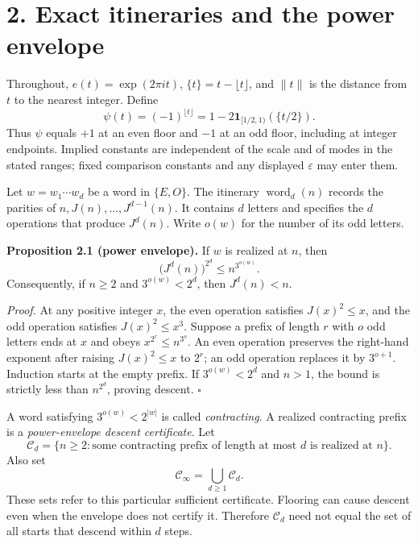 \documentclass[11pt,a4paper]{article}
\begin{document}
\endgroup

\section{2. Exact itineraries and the power
envelope}\label{exact-itineraries-and-the-power-envelope}

Throughout, \(e(t)=\exp(2\pi i t)\), \(\{t\}=t-\lfloor t\rfloor\), and
\(\|t\|\) is the distance from \(t\) to the nearest integer. Define \[
\psi(t)=(-1)^{\lfloor t\rfloor}
=1-2\mathbf 1_{[1/2,1)}(\{t/2\}).
\] Thus \(\psi\) equals \(+1\) at an even floor and \(-1\) at an odd
floor, including at integer endpoints. Implied constants are independent
of the scale and of modes in the stated ranges; fixed comparison
constants and any displayed \(\varepsilon\) may enter them.

Let \(w=w_1\cdots w_d\) be a word in \(\{E,O\}\). The itinerary
\(\operatorname{word}_d(n)\) records the parities of
\(n,J(n),\ldots,J^{d-1}(n)\). It contains \(d\) letters and specifies
the \(d\) operations that produce \(J^d(n)\). Write \(o(w)\) for the
number of its odd letters.


\textbf{Proposition 2.1 (power envelope).} If \(w\) is realized at
\(n\), then \[
\bigl(J^d(n)\bigr)^{2^d}\le n^{3^{o(w)}}.
\] Consequently, if \(n\ge2\) and \(3^{o(w)}<2^d\), then \(J^d(n)<n\).

\emph{Proof.} At any positive integer \(x\), the even operation
satisfies \(J(x)^2\le x\), and the odd operation satisfies
\(J(x)^2\le x^3\). Suppose a prefix of length \(r\) with \(o\) odd
letters ends at \(x\) and obeys \(x^{2^r}\le n^{3^o}\). An even
operation preserves the right-hand exponent after raising
\(J(x)^2\le x\) to \(2^r\); an odd operation replaces it by \(3^{o+1}\).
Induction starts at the empty prefix. If \(3^{o(w)}<2^d\) and \(n>1\),
the bound is strictly less than \(n^{2^d}\), proving descent.
\(\square\)

A word satisfying \(3^{o(w)}<2^{|w|}\) is called \emph{contracting}. A
realized contracting prefix is a \emph{power-envelope descent
certificate}. Let \[
\mathcal C_d=\{n\ge2:\text{some contracting prefix of length at most }d
\text{ is realized at }n\}.
\] Also set \[
\mathcal C_\infty=\bigcup_{d\ge1}\mathcal C_d.
\] These sets refer to this particular sufficient certificate. Flooring
can cause descent even when the envelope does not certify it. Therefore
\(\mathcal C_d\) need not equal the set of all starts that descend
within \(d\) steps.
\end{document}
